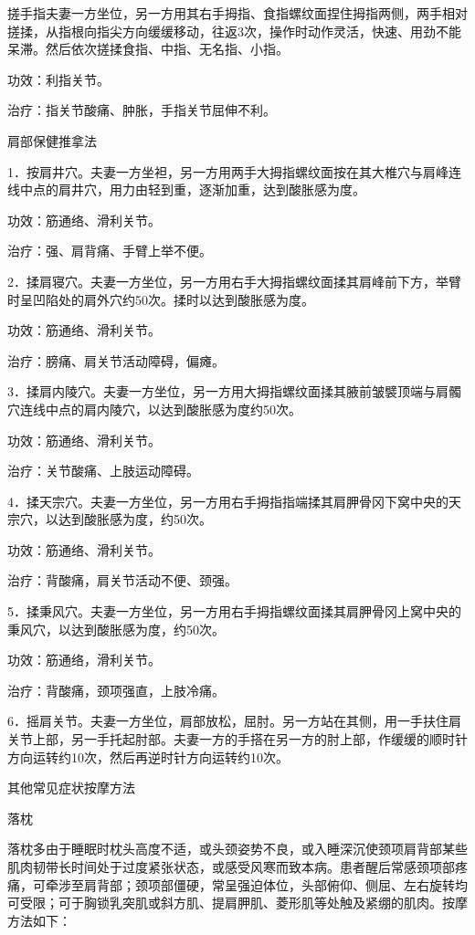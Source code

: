 \documentclass[12pt,UTF8,openany]{ctexbook}
\begin{document}
搓手指夫妻一方坐位，另一方用其右手拇指、食指螺纹面捏住拇指两侧，两手相对搓揉，从指根向指尖方向缓缓移动，往返3次，操作时动作灵活，快速、用劲不能呆滞。然后依次搓揉食指、中指、无名指、小指。

功效：利指关节。

治疗：指关节酸痛、肿胀，手指关节屈伸不利。





肩部保健推拿法


1．按肩井穴。夫妻一方坐袒，另一方用两手大拇指螺纹面按在其大椎穴与肩峰连线中点的肩井穴，用力由轻到重，逐渐加重，达到酸胀感为度。

功效：筋通络、滑利关节。

治疗：强、肩背痛、手臂上举不便。

2．揉肩寝穴。夫妻一方坐位，另一方用右手大拇指螺纹面揉其肩峰前下方，举臂时呈凹陷处的肩外穴约50次。揉时以达到酸胀感为度。

功效：筋通络、滑利关节。

治疗：膀痛、肩关节活动障碍，偏瘫。

3．揉肩内陵穴。夫妻一方坐位，另一方用大拇指螺纹面揉其腋前皱襞顶端与肩髑穴连线中点的肩内陵穴，以达到酸胀感为度约50次。

功效：筋通络、滑利关节。

治疗：关节酸痛、上肢运动障碍。

4．揉天宗穴。夫妻一方坐位，另一方用右手拇指指端揉其肩胛骨冈下窝中央的天宗穴，以达到酸胀感为度，约50次。

功效：筋通络、滑利关节。

治疗：背酸痛，肩关节活动不便、颈强。

5．揉秉风穴。夫妻一方坐位，另一方用右手拇指螺纹面揉其肩胛骨冈上窝中央的秉风穴，以达到酸胀感为度，约50次。

功效：筋通络，滑利关节。

治疗：背酸痛，颈项强直，上肢冷痛。

6．摇肩关节。夫妻一方坐位，肩部放松，屈肘。另一方站在其侧，用一手扶住肩关节上部，另一手托起肘部。夫妻一方的手搭在另一方的肘上部，作缓缓的顺时针方向运转约10次，然后再逆时针方向运转约10次。





其他常见症状按摩方法


落枕

落枕多由于睡眠时枕头高度不适，或头颈姿势不良，或入睡深沉使颈项肩背部某些肌肉韧带长时间处于过度紧张状态，或感受风寒而致本病。患者醒后常感颈项部疼痛，可牵涉至肩背部；颈项部僵硬，常呈强迫体位，头部俯仰、侧屈、左右旋转均可受限；可于胸锁乳突肌或斜方肌、提肩胛肌、菱形肌等处触及紧绷的肌肉。按摩方法如下：
\end{document}
